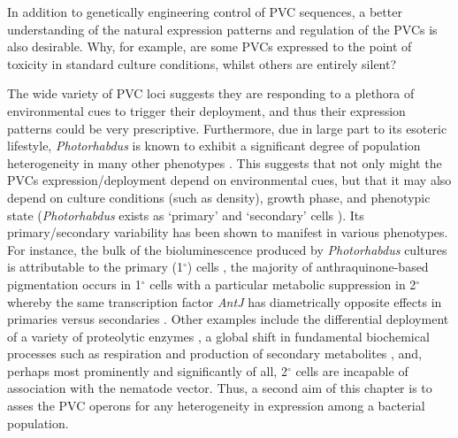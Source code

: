 In addition to genetically engineering control of PVC sequences, a better understanding of the natural expression patterns and regulation of the PVCs is also desirable. Why, for example, are some PVCs expressed to the point of toxicity in standard culture conditions, whilst others are entirely silent?

The wide variety of PVC loci suggests they are responding to a plethora of environmental cues to trigger their deployment, and thus their expression patterns could be very prescriptive. Furthermore, due in large part to its esoteric lifestyle, \emph{Photorhabdus} is known to exhibit a significant degree of population heterogeneity in many other phenotypes \citep{Langer2017, Heinrich2016}. This suggests that not only might the PVCs expression/deployment depend on environmental cues, but that it may also depend on culture conditions (such as density), growth phase, and phenotypic state (\emph{Photorhabdus} exists as `primary' and `secondary' cells \citep{Boemare1988}). Its primary/secondary variability has been shown to manifest in various phenotypes. For instance, the bulk of the bioluminescence produced by \emph{Photorhabdus} cultures is attributable to the primary (1$^{\circ}$) cells \citep{Boemare1988, AKHURST1980}, the majority of anthraquinone-based pigmentation occurs in 1$^{\circ}$ cells  with a particular metabolic suppression in 2$^{\circ}$ whereby the same transcription factor \emph{AntJ} has diametrically opposite effects in primaries versus secondaries \citep{Heinrich2016, Langer2017}. Other examples include the differential deployment of a variety of proteolytic enzymes \citep{Marokhazi2004}, a global shift in fundamental biochemical processes such as respiration \citep{Smigielski1994} and production of secondary metabolites \citep{Turlin2006}, and, perhaps most prominently and significantly of all, 2$^{\circ}$ cells are incapable of association with the nematode vector. Thus, a second aim of this chapter is to asses the PVC operons for any heterogeneity in expression among a bacterial population.

